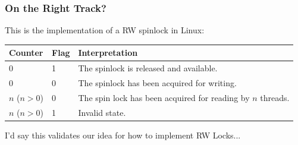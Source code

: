 \begin{frame}
\frametitle{On the Right Track?}

This is the implementation of a RW spinlock in Linux:

\begin{center}
	\begin{tabular}{l|l|l}
		\textbf{Counter} & \textbf{Flag} & \textbf{Interpretation}                                     \\\hline
		0                & 1             & The spinlock is released and available.                     \\
		0                & 0             & The spinlock has been acquired for writing.                 \\
		$n$ ($n > 0$)    & 0             & The spin lock has been acquired for reading by $n$ threads. \\
		$n$ ($n > 0$)    & 1             & Invalid state.                                              \\
	\end{tabular}
\end{center}

I'd say this validates our idea for how to implement RW Locks...

\end{frame}



